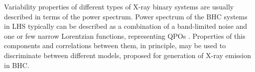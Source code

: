 \documentclass[a4paper,fleqn,usenatbib]{mnras}
\begin{document}
%
%
%

Variability properties of different types of X-ray binary systems are usually described in terms of the power spectrum.
Power spectrum of the BHC systems in LHS typically can be described as a combination of a band-limited noise and one or few narrow Lorentzian functions, representing QPOs \citep[see, e.g.][e.t.c]{1972ApJ...174L..35T, 1990A&A...227L..33B, homan05}. 
Properties of this components and correlations between them, in principle, may be used to discriminate between different models, proposed for generation of X-ray emission in BHC. 
 
\end{document}

